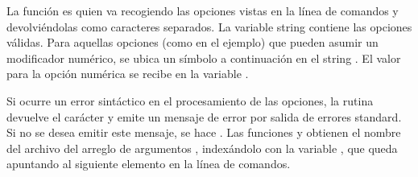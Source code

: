La función  es quien va recogiendo las opciones vistas en la línea de
comandos y devolviéndolas como caracteres separados. La variable string
 contiene las opciones válidas. Para aquellas opciones (como  en el
ejemplo) que pueden asumir un modificador numérico, se ubica un símbolo  a continuación en el string . El valor para la opción numérica
se recibe en la variable .

Si ocurre un error sintáctico en el procesamiento de las opciones, la rutina
devuelve el carácter  y emite un mensaje de error por salida de errores
standard. Si no se desea emitir este mensaje, se hace .
Las funciones  y  obtienen el nombre del archivo del
arreglo de argumentos , indexándolo con la variable , que queda
apuntando al siguiente elemento en la línea de comandos.


